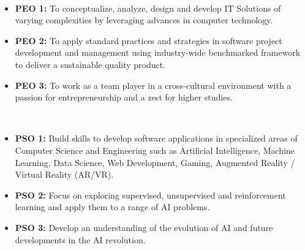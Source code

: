 \newpage
\thispagestyle{frontmatterstyle}

\\
\begin{itemize}
    \item \textbf{PEO 1:} To conceptualize, analyze, design and develop IT Solutions of varying complexities by leveraging advances in computer technology.
    \item \textbf{PEO 2:} To apply standard practices and strategies in software project development and management using industry-wide benchmarked framework to deliver a sustainable quality product.
    \item \textbf{PEO 3:} To work as a team player in a cross-cultural environment with a passion for entrepreneurship and a zest for higher studies.
\end{itemize}

\vspace{0.4cm}
\\
\begin{itemize}
    \item \textbf{PSO 1:} Build skills to develop software applications in specialized areas of Computer Science and Engineering such as Artificial Intelligence, Machine Learning, Data Science, Web Development, Gaming, Augmented Reality / Virtual Reality (AR/VR).
    \item \textbf{PSO 2:} Focus on exploring supervised, unsupervised and reinforcement learning and apply them to a range of AI problems.
    \item \textbf{PSO 3:} Develop an understanding of the evolution of AI and future developments in the AI revolution.
\end{itemize}

\newpage
\thispagestyle{frontmatterstyle}

